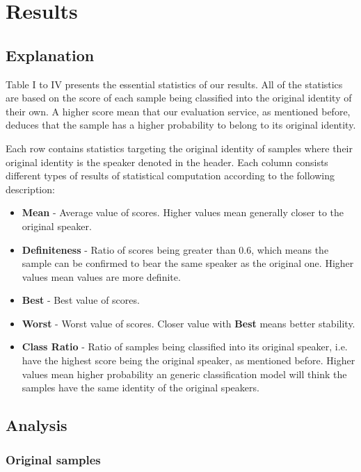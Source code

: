 \documentclass[journal]{IEEEtran} %
\begin{document}
\section{Results}

\subsection{Explanation}

Table I to IV presents the essential statistics of our results. All of the statistics are based on the score of each sample being classified into the original identity of their own. A higher score mean that our evaluation service, as mentioned before, deduces that the sample has a higher probability to belong to its original identity.

Each row contains statistics targeting the original identity of samples where their original identity is the speaker denoted in the header. Each column consists different types of results of statistical computation according to the following description:

\begin{itemize}
    \item \textbf{Mean} - Average value of scores. Higher values mean generally closer to the original speaker.
    \item \textbf{Definiteness} - Ratio of scores being greater than 0.6, which means the sample can be confirmed to bear the same speaker as the original one. Higher values mean values are more definite.
    \item \textbf{Best} - Best value of scores.
    \item \textbf{Worst} - Worst value of scores. Closer value with \textbf{Best} means better stability.
    \item \textbf{Class Ratio} - Ratio of samples being classified into its original speaker, i.e. have the highest score being the original speaker, as mentioned before. Higher values mean higher probability an generic classification model will think the samples have the same identity of the original speakers.
\end{itemize}

\subsection{Analysis}

\subsubsection{Original samples}
\end{document}
